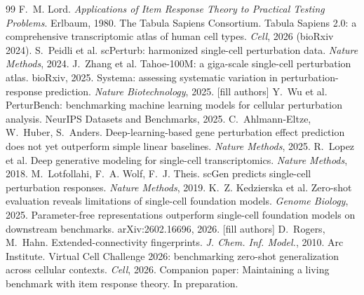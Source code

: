 \documentclass[11pt]{article}
\begin{document}
\begin{thebibliography}{99}
\small
{} F.~M. Lord. \emph{Applications of Item Response Theory to Practical Testing Problems}. Erlbaum, 1980.
 The Tabula Sapiens Consortium. Tabula Sapiens 2.0: a comprehensive transcriptomic atlas of human cell types. \emph{Cell}, 2026 (bioRxiv 2024).
 S.~Peidli et al. scPerturb: harmonized single-cell perturbation data. \emph{Nature Methods}, 2024.
 J.~Zhang et al. Tahoe-100M: a giga-scale single-cell perturbation atlas. bioRxiv, 2025.
 Systema: assessing systematic variation in perturbation-response prediction. \emph{Nature Biotechnology}, 2025. [fill authors]
 Y.~Wu et al. PerturBench: benchmarking machine learning models for cellular perturbation analysis. NeurIPS Datasets and Benchmarks, 2025.
 C.~Ahlmann-Eltze, W.~Huber, S.~Anders. Deep-learning-based gene perturbation effect prediction does not yet outperform simple linear baselines. \emph{Nature Methods}, 2025.
 R.~Lopez et al. Deep generative modeling for single-cell transcriptomics. \emph{Nature Methods}, 2018.
 M.~Lotfollahi, F.~A. Wolf, F.~J. Theis. scGen predicts single-cell perturbation responses. \emph{Nature Methods}, 2019.
 K.~Z. Kedzierska et al. Zero-shot evaluation reveals limitations of single-cell foundation models. \emph{Genome Biology}, 2025.
 Parameter-free representations outperform single-cell foundation models on downstream benchmarks. arXiv:2602.16696, 2026. [fill authors]
 D.~Rogers, M.~Hahn. Extended-connectivity fingerprints. \emph{J. Chem. Inf. Model.}, 2010.
 Arc Institute. Virtual Cell Challenge 2026: benchmarking zero-shot generalization across cellular contexts. \emph{Cell}, 2026.
 Companion paper: Maintaining a living benchmark with item response theory. In preparation.
\end{thebibliography}
\end{document}
